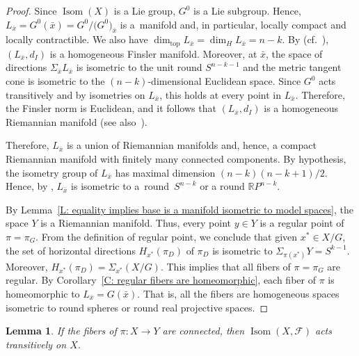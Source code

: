 \documentclass[pdftex]{sigma}
\numberwithin{equation}{section}
\newtheorem{lem}[thm]{Lemma}
\theoremstyle{definition}
\DeclareMathOperator{\Iso}{Isom}
\newcommand{\Sp}{S} %
\newcommand{\RP}{\mathbb{R}P} %
\newcommand{\fol}{\mathcal{F}}
\begin{document}
\begin{proof}
{\samepage
Since $\Iso(X)$ is a Lie group, $G^0$ is a Lie subgroup. Hence, $L_{\bar{x}}=G^0(\bar{x}) = G^0/\bigl(G^0\bigr)_{\bar{x}}$ is a~manifold and, in particular, locally compact and locally contractible. We also have
$\dim_{\mathrm{top}}L_{\bar{x}} = \dim_HL_{\bar{x}} = n-k$.
By \cite{BerestovskiiVershik1992} (cf.\ \cite[Theorem 13]{Berestovskii2014}), $(L_{\bar{x}},d_I)$ is a homogeneous Finsler manifold. Moreover, at $\bar{x}$, the space of directions $\Sigma_{\bar{x}}L_{\bar{x}}$ is isometric to the unit round $\Sp^{n-k-1}$ and the metric tangent cone is isometric to the $(n-k)$-dimensional Euclidean space. Since $G^0$ acts transitively and by isometries on $L_{\bar{x}}$, this holds at every point in $L_{\bar{x}}$. Therefore, the Finsler norm is Euclidean, and it follows that $(L_{\bar{x}},d_I)$ is a homogeneous Riemannian manifold (see also~\cite[Theorem~7]{Berestovskii1989}).

}


Therefore, $L_{\bar{x}}$ is a union of Riemannian manifolds and, hence, a compact Riemannian manifold with finitely many connected components.
By hypothesis, the isometry group of $L_{\bar{x}}$ has maximal dimension $(n-k)(n-k+1)/2$.
Hence, by \cite[Chapter~II, Theorem 3.1]{Kobayashi}, $L_{\bar{x}}$ is isometric to a~round~$\Sp^{n-k}$ or a round $\RP^{n-k}$.

By Lemma~\ref{L: equality implies base is a manifold isometric to model spaces}, the space $Y$ is a Riemannian manifold.
Thus, every point $y\in Y$ is a regular point of $\pi=\pi_G$.
From the definition of regular point, we conclude that given $x^\ast\in X/G$, the set of horizontal directions $H_{x^\ast}(\pi_D)$ of $\pi_D$ is isometric to $\Sigma_{\pi(x^\ast)}Y = \Sp^{k-1}$.
Moreover, $H_{x^\ast}(\pi_D) = \Sigma_{x^\ast}(X/G)$. This implies that all fibers of $\pi=\pi_G$ are regular.
By Corollary~\ref{C: regular fibers are homeomorphic}, each fiber of $\pi$ is homeomorphic to $L_{\bar{x}}=G(\bar{x})$.
That is, all the fibers are homogeneous spaces isometric to round spheres or round real projective spaces.
\end{proof}



\begin{lem}\label{L: Isom(X,F) acts transitively}
If the fibers of $\pi\colon X \to Y$ are connected, then $\Iso(X,\fol)$ acts transitively on $X$.
\end{lem}
\end{document}
